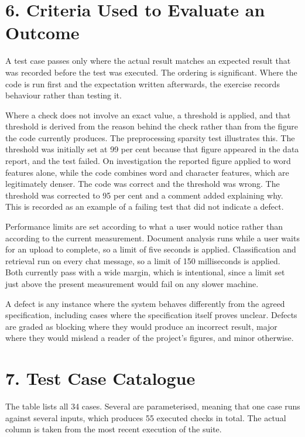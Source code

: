 \documentclass[11pt,a4paper]{article}
\begin{document}
\section{6. Criteria Used to Evaluate an Outcome}
A test case passes only where the actual result matches an expected result that was recorded before the test was executed. The ordering is significant. Where the code is run first and the expectation written afterwards, the exercise records behaviour rather than testing it.

Where a check does not involve an exact value, a threshold is applied, and that threshold is derived from the reason behind the check rather than from the figure the code currently produces. The preprocessing sparsity test illustrates this. The threshold was initially set at 99 per cent because that figure appeared in the data report, and the test failed. On investigation the reported figure applied to word features alone, while the code combines word and character features, which are legitimately denser. The code was correct and the threshold was wrong. The threshold was corrected to 95 per cent and a comment added explaining why. This is recorded as an example of a failing test that did not indicate a defect.

Performance limits are set according to what a user would notice rather than according to the current measurement. Document analysis runs while a user waits for an upload to complete, so a limit of five seconds is applied. Classification and retrieval run on every chat message, so a limit of 150 milliseconds is applied. Both currently pass with a wide margin, which is intentional, since a limit set just above the present measurement would fail on any slower machine.

A defect is any instance where the system behaves differently from the agreed specification, including cases where the specification itself proves unclear. Defects are graded as blocking where they would produce an incorrect result, major where they would mislead a reader of the project's figures, and minor otherwise.

\section{7. Test Case Catalogue}
The table lists all 34 cases. Several are parameterised, meaning that one case runs against several inputs, which produces 55 executed checks in total. The actual column is taken from the most recent execution of the suite.
\end{document}
